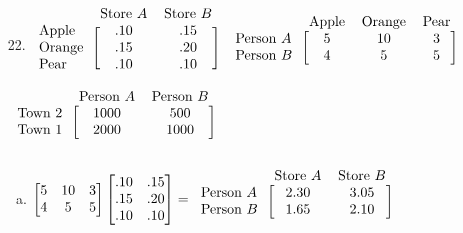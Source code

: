 \documentclass[letterpaper,fleqn]{article}
\begin{document}
\begin{enumerate}
\begin{enumerate}
			\item [22.]
			$\begin{blockarray}{ccc}
				& \text{Store $A$} & \text{Store $B$} \\
				\begin{block}{l[cc]}
					\text{Apple} & .10 & .15  \\
					\text{Orange} & .15 & .20  \\
					\text{Pear} & .10 & .10  \\
				\end{block}
			\end{blockarray}$
			$\begin{blockarray}{cccc}
				& \text{Apple} & \text{Orange} & \text{Pear} \\
				\begin{block}{l[ccc]}
					\text{Person $A$} & 5 & 10 & 3  \\
					\text{Person $B$} & 4 & 5 & 5  \\
				\end{block}
			\end{blockarray}$ \\
			$\begin{blockarray}{ccc}
				& \text{Person $A$} & \text{Person $B$} \\
				\begin{block}{l[cc]}
					\text{Town 2} & 1000 & 500\\
					\text{Town 1} & 2000 & 1000 \\
				\end{block}
			\end{blockarray}$
			\begin{enumerate}[(a)]
				\item
				$\begin{bmatrix*}
					5 & 10 & 3 \\
					4 & 5 & 5 \\
				\end{bmatrix*}
				\begin{bmatrix*}
					.10 & .15 \\
					.15 & .20 \\
					.10 & .10 \\
				\end{bmatrix*}
				=
				\begin{blockarray}{ccc}
					& \text{Store $A$} & \text{Store $B$} \\
					\begin{block}{l[cc]}
						\text{Person $A$} & 2.30 & 3.05 \\
						\text{Person $B$} & 1.65 & 2.10 \\
					\end{block}
				\end{blockarray}$
				

\end{enumerate}
\end{enumerate}
\end{enumerate}
\end{document}
